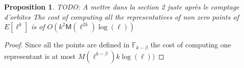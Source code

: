 \documentclass{lms}
\newcommand{\todo}[1]{{\color{red}TODO: #1}}
\newtheorem{prop}[thm]{Proposition}
\newcommand{\M}{\mathsf{M}}
\newcommand{\F}{\mathbb{F}}
\begin{document}
%
%

\begin{prop}\todo{A mettre dans la section 2 juste après le comptage d'orbites}
The cost of computing all the representatives of non zero points of $E[\ell^k]$ is of $O(k^2\mathsf{M}(\ell^{2k})\log(\ell))$
\end{prop}
	
\begin{proof}
Since all the points are defined in $\F_{k-\beta}$ the cost of computing one representant is at most $M(\ell^{k-\beta})k\log(\ell))$
\end{proof}
 
\end{document}
